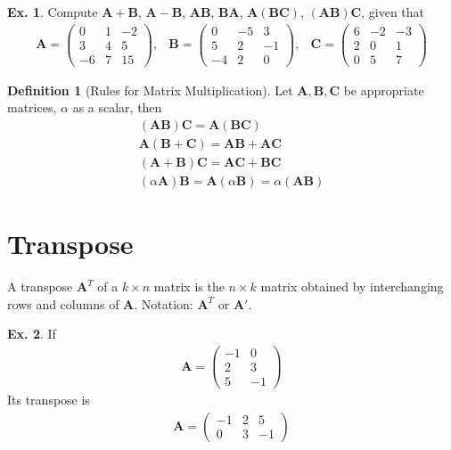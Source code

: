 \documentclass[10pt,a4paper]{book}
\theoremstyle{definition}\newtheorem{definition}{Definition}
\theoremstyle{definition}\newtheorem{fact}{Fact}
\theoremstyle{definition}\newtheorem{ex}{Ex.}
\theoremstyle{definition}\newtheorem{project}{Project}
\theoremstyle{definition}\newtheorem{problem}{Problem}
\theoremstyle{definition}\newtheorem{example}{Example}
\numberwithin{theorem}{chapter}
\numberwithin{corollary}{chapter}
\numberwithin{assumption}{chapter}
\numberwithin{definition}{chapter}
\numberwithin{prop}{chapter}
\numberwithin{notation}{chapter}
\numberwithin{problem}{chapter}
\numberwithin{example}{chapter}
\numberwithin{fact}{chapter}
\numberwithin{ex}{chapter}
\newenvironment{fdefinition}
{\begin{mdframed}\begin{definition}}
		{\end{definition}\end{mdframed}}
\def\A{\mathbf A}
\def\B{\mathbf B}
\def\C{\mathbf C}
\begin{document}
	\begin{ex}
		Compute $\A + \B$, $\A-\B$, $\A \B$, $\B \A$, $\A ( \B \C)$, $(\A \B) \C$, given that
		\begin{align*}
			\A = \begin{pmatrix}
				0  & 1  & -2 \\
				3  & 4  & 5  \\
				-6 & 7  & 15 
			\end{pmatrix}, & 
			\B = \begin{pmatrix}
				0  & -5 & 3  \\
				5  & 2  & -1 \\
				-4 & 2  & 0  
			\end{pmatrix}, &
			\C = \begin{pmatrix}
				6  & -2 & -3 \\
				2  & 0  & 1  \\
				0  & 5  & 7  
			\end{pmatrix} 
		\end{align*}
	\end{ex}
	
	\begin{fdefinition}[Rules for Matrix Multiplication]
	Let $\A,\B,\C$ be appropriate matrices, $\alpha$ as a scalar, then
		\begin{align*}
			(\A \B) \C = \A (\B \C) \\
			\A (\B + \C) = \A \B + \A \C \\
			(\A + \B)\C = \A \C + \B \C \\
			(\alpha \A)\B = \A (\alpha \B) = \alpha (\A \B)
		\end{align*}
	\end{fdefinition}
	
	\section{Transpose}
	A transpose $\A^T$ of a $k \times n$ matrix is the $n\times k$ matrix obtained by interchanging rows and columns of $\A$. Notation: $\A^T$ or $\A'$.
	
	\begin{ex}
		If
		\begin{align*}
			\A = \begin{pmatrix}
				-1 & 0  \\
				2  & 3  \\
				5  & -1 
			\end{pmatrix}
		\end{align*}
		Its transpose is
		\begin{align*}
			\A = \begin{pmatrix}
				-1 & 2 & 5  \\
				0  & 3 & -1 
			\end{pmatrix}
		\end{align*}
	\end{ex}
	
\end{document}
